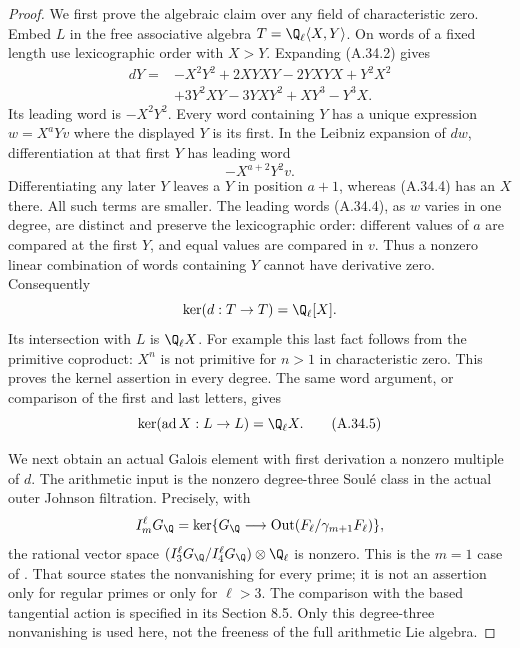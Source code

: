 \begin{proof}
We first prove the algebraic claim over any field of
characteristic zero. Embed $L$ in the free associative algebra
$T=\Q_\ell\langle X,Y\rangle$. On words of a fixed length use
lexicographic order with $X>Y$. Expanding (A.34.2) gives
\[
\begin{split}
 dY={}&-X^2Y^2+2XYXY-2YXYX+Y^2X^2\\
      &+3Y^2XY-3YXY^2+XY^3-Y^3X .
\end{split}
                                                        \tag{A.34.3}
\]
Its leading word is $-X^2Y^2$. Every word containing $Y$ has a
unique expression $w=X^aYv$ where the displayed $Y$ is its first.
In the Leibniz expansion of $dw$, differentiation at that first
$Y$ has leading word
\[
                         -X^{a+2}Y^2v.               \tag{A.34.4}
\]
Differentiating any later $Y$ leaves a $Y$ in position $a+1$,
whereas (A.34.4) has an $X$ there. All such terms are smaller.
The leading words (A.34.4), as $w$ varies in one degree, are
distinct and preserve the lexicographic order: different values
of $a$ are compared at the first $Y$, and equal values are
compared in $v$. Thus a nonzero linear combination of words
containing $Y$ cannot have derivative zero. Consequently
\[
                    \ker(d:T\to T)=\Q_\ell[X].
\]
Its intersection with $L$ is $\Q_\ell X$. For example this last
fact follows from the primitive coproduct: $X^n$ is not
primitive for $n>1$ in characteristic zero. This proves the
kernel assertion in every degree. The same word argument, or
comparison of the first and last letters, gives
\[
       \ker(\operatorname{ad}X:L\to L)=\Q_\ell X.    \tag{A.34.5}
\]

We next obtain an actual Galois element with first derivation a
nonzero multiple of $d$. The arithmetic input is the nonzero
degree-three Soul\'e class in the actual outer Johnson filtration.
Precisely, with
\[
 I_m^\ell G_\Q=\ker\{G_\Q\longrightarrow
             \operatorname{Out}(F_\ell/\gamma_{m+1}F_\ell)\},
\]
the rational vector space
$(I_3^\ell G_\Q/I_4^\ell G_\Q)\otimes\Q_\ell$ is nonzero.
This is the $m=1$ case of
\cite[Remark 8.6, together with Theorem 8.4 and
the filtration comparison in Proposition 8.2]{A_HainMatsumoto2003}.
That source states the nonvanishing for every prime; it is not
an assertion only for regular primes or only for $\ell>3$.
The comparison with the based tangential action is specified
in its Section 8.5. Only this degree-three nonvanishing is
used here, not the freeness of the full arithmetic Lie algebra.


\end{proof}
